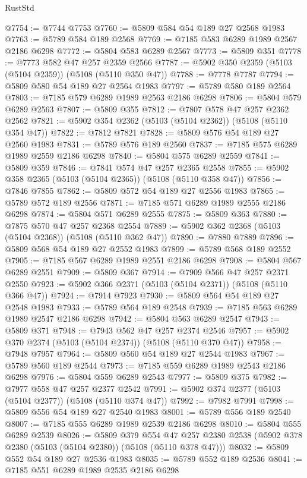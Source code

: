 \begin{lexlean}{RustStd}
\begin{coremodule}
@7754 := @7744 @7753
@7760 := @5809 @584 @54 @189 @27 @2568 @1983
@7763 := @5789 @584 @189 @2568
@7769 := @7185 @583 @6289 @1989 @2567 @2186 @6298
@7772 := @5804 @583 @6289 @2567
@7773 := @5809 @351
@7778 := @7773 @582 @47 @257 @2359 @2566
@7787 := @5902 @350 @2359 (@5103 (@5104 @2359)) (@5108 (@5110 @350 @47))
@7788 := @7778 @7787
@7794 := @5809 @580 @54 @189 @27 @2564 @1983
@7797 := @5789 @580 @189 @2564
@7803 := @7185 @579 @6289 @1989 @2563 @2186 @6298
@7806 := @5804 @579 @6289 @2563
@7807 := @5809 @355
@7812 := @7807 @578 @47 @257 @2362 @2562
@7821 := @5902 @354 @2362 (@5103 (@5104 @2362)) (@5108 (@5110 @354 @47))
@7822 := @7812 @7821
@7828 := @5809 @576 @54 @189 @27 @2560 @1983
@7831 := @5789 @576 @189 @2560
@7837 := @7185 @575 @6289 @1989 @2559 @2186 @6298
@7840 := @5804 @575 @6289 @2559
@7841 := @5809 @359
@7846 := @7841 @574 @47 @257 @2365 @2558
@7855 := @5902 @358 @2365 (@5103 (@5104 @2365)) (@5108 (@5110 @358 @47))
@7856 := @7846 @7855
@7862 := @5809 @572 @54 @189 @27 @2556 @1983
@7865 := @5789 @572 @189 @2556
@7871 := @7185 @571 @6289 @1989 @2555 @2186 @6298
@7874 := @5804 @571 @6289 @2555
@7875 := @5809 @363
@7880 := @7875 @570 @47 @257 @2368 @2554
@7889 := @5902 @362 @2368 (@5103 (@5104 @2368)) (@5108 (@5110 @362 @47))
@7890 := @7880 @7889
@7896 := @5809 @568 @54 @189 @27 @2552 @1983
@7899 := @5789 @568 @189 @2552
@7905 := @7185 @567 @6289 @1989 @2551 @2186 @6298
@7908 := @5804 @567 @6289 @2551
@7909 := @5809 @367
@7914 := @7909 @566 @47 @257 @2371 @2550
@7923 := @5902 @366 @2371 (@5103 (@5104 @2371)) (@5108 (@5110 @366 @47))
@7924 := @7914 @7923
@7930 := @5809 @564 @54 @189 @27 @2548 @1983
@7933 := @5789 @564 @189 @2548
@7939 := @7185 @563 @6289 @1989 @2547 @2186 @6298
@7942 := @5804 @563 @6289 @2547
@7943 := @5809 @371
@7948 := @7943 @562 @47 @257 @2374 @2546
@7957 := @5902 @370 @2374 (@5103 (@5104 @2374)) (@5108 (@5110 @370 @47))
@7958 := @7948 @7957
@7964 := @5809 @560 @54 @189 @27 @2544 @1983
@7967 := @5789 @560 @189 @2544
@7973 := @7185 @559 @6289 @1989 @2543 @2186 @6298
@7976 := @5804 @559 @6289 @2543
@7977 := @5809 @375
@7982 := @7977 @558 @47 @257 @2377 @2542
@7991 := @5902 @374 @2377 (@5103 (@5104 @2377)) (@5108 (@5110 @374 @47))
@7992 := @7982 @7991
@7998 := @5809 @556 @54 @189 @27 @2540 @1983
@8001 := @5789 @556 @189 @2540
@8007 := @7185 @555 @6289 @1989 @2539 @2186 @6298
@8010 := @5804 @555 @6289 @2539
@8026 := @5809
    @379
    @554
    @47
    @257
    @2380
    @2538
    (@5902 @378 @2380 (@5103 (@5104 @2380)) (@5108 (@5110 @378 @47)))
@8032 := @5809 @552 @54 @189 @27 @2536 @1983
@8035 := @5789 @552 @189 @2536
@8041 := @7185 @551 @6289 @1989 @2535 @2186 @6298

\end{coremodule}
\end{lexlean}
